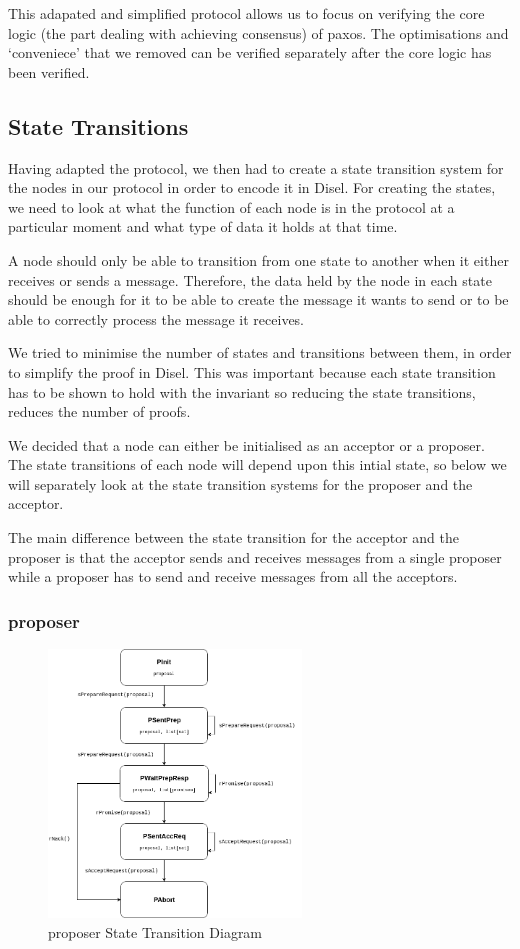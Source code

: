 This adapated and simplified protocol allows us to focus on verifying the core
logic (the part dealing with achieving consensus) of paxos. The
optimisations and `conveniece' that we removed can be verified separately after
the core logic has been verified.


\subsection{State Transitions}
Having adapted the protocol, we then had to create a state transition system for
the nodes in our protocol in order to encode it in Disel. For creating the states,
we need to look at what the function of each node is in the protocol at a particular
moment and what type of data it holds at that time.

A node should only be able to transition from one state to another when it either
receives or sends a message. Therefore, the data held by the node in each state
should be enough for it to be able to create the message it wants to send or to
be able to correctly process the message it receives.

We tried to minimise the number of states and transitions between them, in order
to simplify the proof in Disel. This was important because each state transition
has to be shown to hold with the invariant so reducing the state transitions,
reduces the number of proofs.

We decided that a node can either be initialised as an acceptor or a proposer.
The state transitions of each node will depend upon this intial state, so below
we will separately look at the state transition systems for the proposer and the
acceptor.

The main difference between the state transition for the acceptor and the proposer
is that the acceptor sends and receives messages from a single proposer while a
proposer has to send and receive messages from all the acceptors.


\subsubsection{proposer}
\begin{figure}
\centering
\includegraphics[width=0.6\textwidth]{figures/proposer_state_transitions.png}
\caption{proposer State Transition Diagram
\label{fig:myInlineFigure}}
\end{figure}

